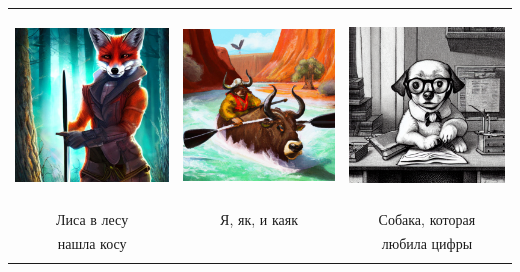 \documentclass[14pt]{memoir}
\begin{document}
\begin{table}[h]
\begin{tabular}{ccc}
\includegraphics[height=5cm]{images/lisa-v-lesu} & \includegraphics[height=5cm]{images/yak-kayak} & \includegraphics[height=5cm]{images/dog-book-cooker}             \\
 Лиса в лесу    &  Я, як, и каяк        &   Собака, которая            \\
  нашла косу &  & любила цифры \\
            &          &              \\

\end{tabular}
\end{table}
\end{document}
